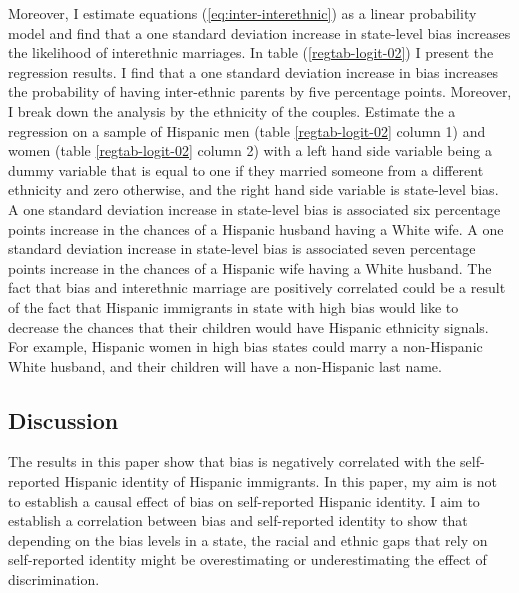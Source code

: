 \documentclass[12pt, fullpage]{article}
\begin{document}
Moreover, I estimate equations (\ref{eq:inter-interethnic}) as a linear probability model and find that a one standard deviation increase in state-level bias increases the likelihood of interethnic marriages. In table (\ref{regtab-logit-02}) I present the regression results. I find that a one standard deviation increase in bias increases the probability of having inter-ethnic parents by five percentage points. Moreover, I break down the analysis by the ethnicity of the couples. Estimate the a regression on a sample of Hispanic men (table \ref{regtab-logit-02} column 1) and women (table \ref{regtab-logit-02} column 2) with a left hand side variable being a dummy variable that is equal to one if they married someone from a different ethnicity and zero otherwise, and the right hand side variable is state-level bias. A one standard deviation increase in state-level bias is associated six percentage points increase in the chances of a Hispanic husband having a White wife. A one standard deviation increase in state-level bias is associated seven percentage points increase in the chances of a Hispanic wife having a White husband. The fact that bias and interethnic marriage are positively correlated could be a result of the fact that Hispanic immigrants in state with high bias would like to decrease the chances that their children would have Hispanic ethnicity signals. For example, Hispanic women in high bias states could marry a non-Hispanic White husband, and their children will have a non-Hispanic last name.



\subsection{Discussion} \label{subsec:disc}

The results in this paper show that bias is negatively correlated with the self-reported Hispanic identity of Hispanic immigrants. In this paper, my aim is not to establish a causal effect of bias on self-reported Hispanic identity. I aim to establish a correlation between bias and self-reported identity to show that depending on the bias levels in a state, the racial and ethnic gaps that rely on self-reported identity might be overestimating or underestimating the effect of discrimination. 
\end{document}
